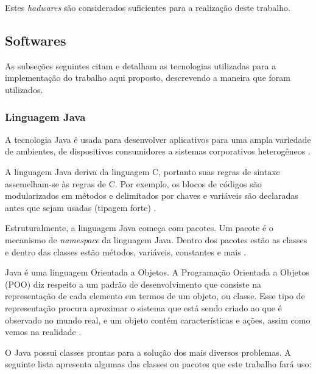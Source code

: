 Estes \textit{hadwares} são considerados suficientes para a realização deste trabalho.

\subsection{Softwares}\label{sub-softw}
As subseções seguintes citam e detalham as tecnologias utilizadas para a implementação do trabalho aqui proposto,  descrevendo a maneira que foram utilizados.

\subsubsection{Linguagem Java}\label{subsec:java}
A tecnologia Java é usada para desenvolver aplicativos para uma ampla variedade de ambientes, de dispositivos consumidores a sistemas corporativos heterogêneos \cite{ibm_java}. 

A linguagem Java deriva da linguagem C, portanto suas regras de sintaxe assemelham-se às regras de C. Por exemplo, os blocos de códigos são modularizados em métodos e delimitados por chaves e variáveis são declaradas antes que sejam usadas (tipagem forte) \cite{ibm_java}. 

Estruturalmente, a linguagem Java começa com pacotes. Um pacote é o mecanismo de \textit{namespace} da linguagem Java. Dentro dos pacotes estão as classes e dentro das classes estão métodos, variáveis, constantes e mais \cite{ibm_java}.

Java é uma linguagem Orientada a Objetos. A Programação Orientada a Objetos (POO) diz respeito a um padrão de desenvolvimento que consiste na representação de cada elemento em termos de um objeto, ou classe. Esse tipo de representação procura aproximar o sistema que está sendo criado ao que é observado no mundo real, e um objeto contém características e ações, assim como vemos na realidade \cite{dev_poo}. 

O Java possui classes prontas para a solução dos mais diversos problemas. A seguinte lista apresenta algumas das classes ou pacotes que este trabalho fará uso:

